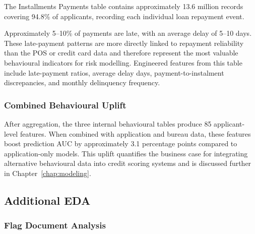 The Installments Payments table contains approximately 13.6 million records covering 94.8\% of applicants, recording each individual loan repayment event.



Approximately 5--10\% of payments are late, with an average delay of 5--10 days. These late-payment patterns are more directly linked to repayment reliability than the POS or credit card data and therefore represent the most valuable behavioural indicators for risk modelling. Engineered features from this table include late-payment ratios, average delay days, payment-to-instalment discrepancies, and monthly delinquency frequency.

\subsubsection{Combined Behavioural Uplift}



After aggregation, the three internal behavioural tables produce 85 applicant-level features. When combined with application and bureau data, these features boost prediction AUC by approximately 3.1 percentage points compared to application-only models. This uplift quantifies the business case for integrating alternative behavioural data into credit scoring systems and is discussed further in Chapter~\ref{chap:modeling}.

\FloatBarrier

\subsection{Additional EDA}
\label{subsec:additional_eda}

\subsubsection{Flag Document Analysis}

